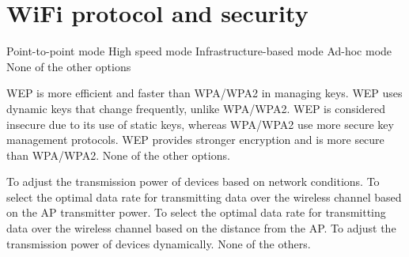 \section{WiFi protocol and security}

\begin{checkboxes}
    \choice Point-to-point mode
    \choice High speed mode
    \CorrectChoice Infrastructure-based mode
    \CorrectChoice Ad-hoc mode
    \choice None of the other options

\end{checkboxes}



\begin{checkboxes}
    \choice WEP is more efficient and faster than WPA/WPA2 in managing keys.
    \choice WEP uses dynamic keys that change frequently, unlike WPA/WPA2.
    \CorrectChoice WEP is considered insecure due to its use of static keys, whereas WPA/WPA2 use more secure key management protocols.
    \choice WEP provides stronger encryption and is more secure than WPA/WPA2.
    \choice None of the other options.
\end{checkboxes}








\begin{checkboxes}
    \choice To adjust the transmission power of devices based on network conditions.
    \choice To select the optimal data rate for transmitting data over the wireless channel based on the AP transmitter power.
    \choice To select the optimal data rate for transmitting data over the wireless channel based on the distance from the AP.
    \choice To adjust the transmission power of devices dynamically.
    \CorrectChoice None of the others.
\end{checkboxes}

